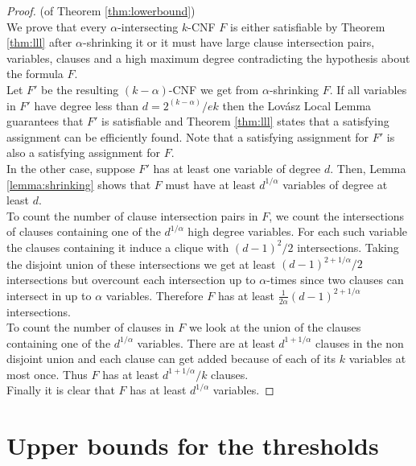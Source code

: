 \documentclass[11pt,letterpaper]{article}
\begin{document}
\begin{proof} (of Theorem \ref{thm:lowerbound})\\
We prove that every $\alpha$-intersecting $k$-CNF $F$ is either satisfiable by Theorem \ref{thm:lll} after $\alpha$-shrinking it or it must have large clause intersection pairs, variables, clauses and a high maximum degree contradicting the hypothesis about the formula $F$.\\

Let $F'$ be the resulting $(k-\alpha)$-CNF we get from $\alpha$-shrinking $F$. If all variables in $F'$ have degree less than $d = 2^{(k-\alpha)}/ek$ then the Lov\'asz Local Lemma guarantees that $F'$ is satisfiable and Theorem \ref{thm:lll} states that a satisfying assignment can be efficiently found. Note that a satisfying assignment for $F'$ is also a satisfying assignment for $F$.\\

In the other case, suppose $F'$ has at least one variable of degree $d$. Then, Lemma \ref{lemma:shrinking} shows that $F$ must have at least $d^{1/\alpha}$ variables of degree at least $d$.\\

To count the number of clause intersection pairs in $F$, we count the intersections of clauses containing one of the $d^{1/\alpha}$ high degree variables. For each such variable the clauses containing it induce a clique with $(d-1)^2/2 $ intersections. Taking the disjoint union of these intersections we get at least $(d-1)^{2+1/\alpha}/2$ intersections but overcount each intersection up to $\alpha$-times since two clauses can intersect in up to $\alpha$ variables. Therefore $F$ has at least $\frac{1}{2\alpha} (d-1)^{2+1/\alpha}$ intersections.\\

To count the number of clauses in $F$ we look at the union of the clauses containing one of the $d^{1/\alpha}$ variables. There are at least $d^{1+1/\alpha}$ clauses in the non disjoint union and each clause can get added because of each of its $k$ variables at most once. Thus $F$ has at least $d^{1+1/\alpha}/k$ clauses.\\

Finally it is clear that $F$ has at least $d^{1/\alpha}$ variables. 
\end{proof}



\section{Upper bounds for the thresholds}
\end{document}

